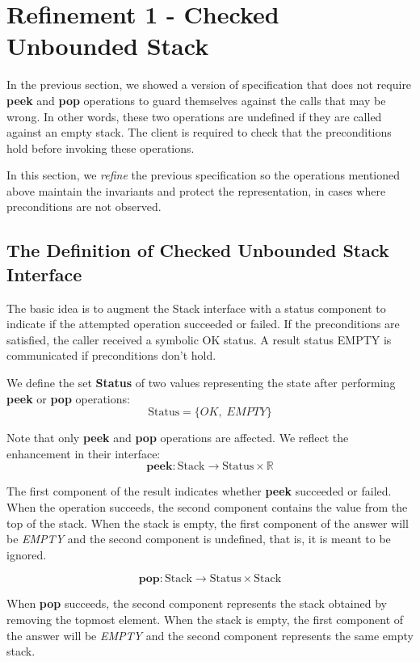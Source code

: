 \documentclass[10pt]{article}
\begin{document}

\section{Refinement 1 - Checked Unbounded Stack}
\noindent In the previous section, we showed a version of specification that does not require \textbf{peek} and \textbf{pop} operations to guard themselves against the calls that may be wrong. In other words, these two operations are undefined if they are called against an empty stack. The client is required to check that the preconditions hold before invoking these operations.

In this section, we \emph{refine} the previous specification so the operations mentioned above maintain the invariants and protect the representation, in cases where preconditions are not observed.

\subsection{The Definition of Checked Unbounded Stack Interface}
The basic idea is to augment the Stack interface with a status component to indicate if the  attempted operation succeeded or failed. If the preconditions are satisfied, the caller received a symbolic OK status. A result status EMPTY is communicated if preconditions don't hold.

We define the set \textbf{Status} of two values representing the state after performing \textbf{peek} or \textbf{pop} operations:
\[
    \mathrm{Status} = \{ OK, \; EMPTY \}
\]

Note that only \textbf{peek} and \textbf{pop} operations are affected. We reflect the enhancement in their interface:
\[
\textbf{peek}: \mathrm{Stack} \rightarrow \mathrm{Status} \times {\mathbb{R}}
\]

The first component of the result indicates whether \textbf{peek} succeeded or failed. When the operation succeeds, the second component contains the value from the top of the stack. When the stack is empty, the first component of the answer will be \emph{EMPTY} and the second component is undefined, that is, it is meant to be ignored.

\[
\textbf{pop}: \mathrm{Stack} \rightarrow \mathrm{Status} \times \mathrm{Stack}
\]

When \textbf{pop} succeeds, the second component represents the stack obtained by removing the topmost element. When the stack is empty, the first component of the answer will be \emph{EMPTY} and the second component represents the same empty stack.
\end{document}
